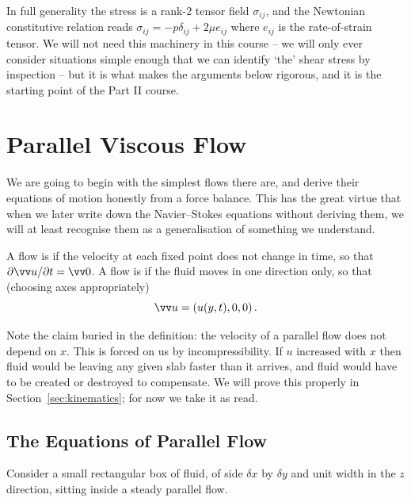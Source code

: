\begin{remark}
	In full generality the stress is a rank-$2$ tensor field $\sigma_{ij}$, and the Newtonian constitutive relation reads $\sigma_{ij} = -p \delta_{ij} + 2\mu e_{ij}$ where $e_{ij}$ is the rate-of-strain tensor. We will not need this machinery in this course -- we will only ever consider situations simple enough that we can identify `the' shear stress by inspection -- but it is what makes the arguments below rigorous, and it is the starting point of the Part II course.
\end{remark}

\section{Parallel Viscous Flow}

We are going to begin with the simplest flows there are, and derive their equations of motion honestly from a force balance. This has the great virtue that when we later write down the Navier--Stokes equations without deriving them, we will at least recognise them as a generalisation of something we understand.

\begin{definition}
	A flow is  if the velocity at each fixed point does not change in time, so that $\partial \vv u / \partial t = \vv 0$. A flow is  if the fluid moves in one direction only, so that (choosing axes appropriately)
	$$
	\vv u = \left(u(y, t), 0, 0\right).
	$$
\end{definition}

Note the claim buried in the definition: the velocity of a parallel flow does not depend on $x$. This is forced on us by incompressibility. If $u$ increased with $x$ then fluid would be leaving any given slab faster than it arrives, and fluid would have to be created or destroyed to compensate. We will prove this properly in Section~\ref{sec:kinematics}; for now we take it as read.

\subsection{The Equations of Parallel Flow}

Consider a small rectangular box of fluid, of side $\delta x$ by $\delta y$ and unit width in the $z$ direction, sitting inside a steady parallel flow.

